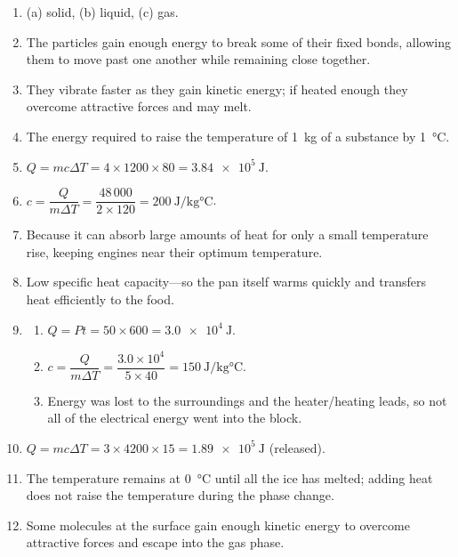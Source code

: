 \documentclass{article}
\begin{document}
\begin{enumerate}
\item (a) solid, (b) liquid, (c) gas.

\item The particles gain enough energy to break some of their fixed bonds, allowing them to move past one another while remaining close together.

\item They vibrate faster as they gain kinetic energy; if heated enough they overcome attractive forces and may melt.

\item The energy required to raise the temperature of \SI{1}{\kilogram} of a substance by \SI{1}{\celsius}.

\item $Q = mc\Delta T = 4 \times 1200 \times 80 = \SI{3.84e5}{\joule}$.

\item $c = \dfrac{Q}{m\Delta T} = \dfrac{48\,000}{2 \times 120} = \SI{200}{\joule\per\kilogram\celsius}$.

\item Because it can absorb large amounts of heat for only a small temperature rise, keeping engines near their optimum temperature.

\item Low specific heat capacity—so the pan itself warms quickly and transfers heat efficiently to the food.

\item 
  \begin{enumerate}
    \item $Q = Pt = 50 \times 600 = \SI{3.0e4}{\joule}$.  
    \item $c = \dfrac{Q}{m\Delta T} = \dfrac{3.0\times10^{4}}{5 \times 40} = \SI{150}{\joule\per\kilogram\celsius}$.  
    \item Energy was lost to the surroundings and the heater/heating leads, so not all of the electrical energy went into the block.
  \end{enumerate}

\item $Q = mc\Delta T = 3 \times 4200 \times 15 = \SI{1.89e5}{\joule}$ (released).

\item The temperature remains at \SI{0}{\celsius} until all the ice has melted; adding heat does not raise the temperature during the phase change.

\item Some molecules at the surface gain enough kinetic energy to overcome attractive forces and escape into the gas phase.


\end{enumerate}
\end{document}
